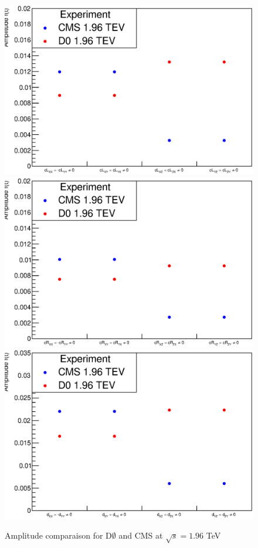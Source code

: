 \documentclass[a4paper,11pt,twoside,french]{article}
\begin{document}
    \begin{figure}[h!]
        \begin{center}
            \includegraphics[scale=0.4]{compaCMSTEVL.eps}
            \includegraphics[scale=0.4]{compaCMSTEVR.eps}
            \includegraphics[scale=0.4]{compaCMSTEVD.eps}
            \caption{Amplitude comparaison for D$\emptyset$ and CMS at $\sqrt{s} = 1.96$ TeV}
        \end{center}
    \end{figure}
\end{document}
